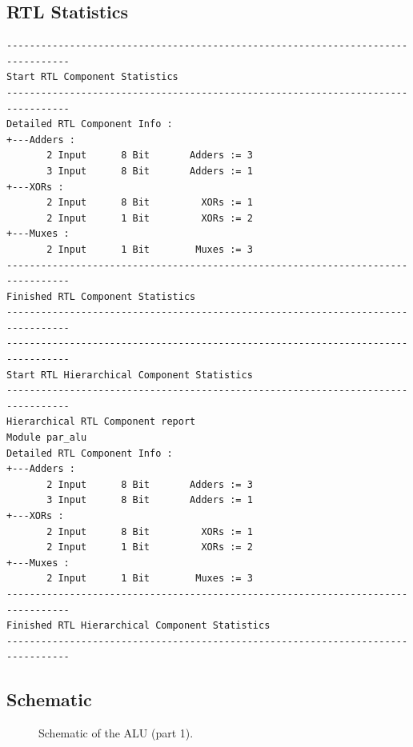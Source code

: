 \documentclass[10pt]{article}
\begin{document}
\subsection{RTL Statistics}
\begin{verbatim}
---------------------------------------------------------------------------------
Start RTL Component Statistics 
---------------------------------------------------------------------------------
Detailed RTL Component Info : 
+---Adders : 
	   2 Input      8 Bit       Adders := 3     
	   3 Input      8 Bit       Adders := 1     
+---XORs : 
	   2 Input      8 Bit         XORs := 1     
	   2 Input      1 Bit         XORs := 2     
+---Muxes : 
	   2 Input      1 Bit        Muxes := 3     
---------------------------------------------------------------------------------
Finished RTL Component Statistics 
---------------------------------------------------------------------------------
---------------------------------------------------------------------------------
Start RTL Hierarchical Component Statistics 
---------------------------------------------------------------------------------
Hierarchical RTL Component report 
Module par_alu 
Detailed RTL Component Info : 
+---Adders : 
	   2 Input      8 Bit       Adders := 3     
	   3 Input      8 Bit       Adders := 1     
+---XORs : 
	   2 Input      8 Bit         XORs := 1     
	   2 Input      1 Bit         XORs := 2     
+---Muxes : 
	   2 Input      1 Bit        Muxes := 3     
---------------------------------------------------------------------------------
Finished RTL Hierarchical Component Statistics
---------------------------------------------------------------------------------
\end{verbatim}
\newpage
\subsection{Schematic}
\begin{figure}[h!t]
    \centering
    \caption{Schematic of the ALU (part 1).}
    \label{fig:Schematic of Sequential Elements}
\end{figure}
\newpage
\end{document}
